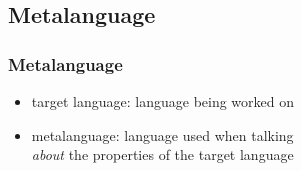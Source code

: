 \documentclass[dvipsnames]{beamer}
\begin{document}
%
%
%
%
%

\subsection{Metalanguage}

\begin{frame}
  \frametitle{Metalanguage}

  \begin{itemize}
    \item \alert{target language}: language being worked on

    \medskip
    \item \alert{metalanguage}: language used when talking\\
      \emph{about} the properties of the target language
  \end{itemize}
\end{frame}
\end{document}
